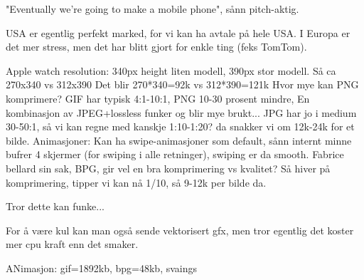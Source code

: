 "Eventually we're going to make a mobile phone", sånn pitch-aktig.

USA er egentlig perfekt marked, for vi kan ha avtale på hele USA. I Europa er
det mer stress, men det har blitt gjort for enkle ting (feks TomTom).

Apple watch resolution: 340px height liten modell, 390px stor modell.
Så ca 270x340 vs 312x390
Det blir 270*340=92k vs 312*390=121k
Hvor mye kan PNG komprimere? GIF har typisk 4:1-10:1, PNG 10-30 prosent mindre,
En kombinasjon av JPEG+lossless funker og blir mye brukt... JPG har jo i medium
30-50:1, så vi kan regne med kanskje 1:10-1:20? da snakker vi om 12k-24k for et
bilde. Animasjoner: Kan ha swipe-animasjoner som default, sånn internt minne
bufrer 4 skjermer (for swiping i alle retninger), swiping er da smooth.
Fabrice bellard sin sak, BPG, gir vel en bra komprimering vs kvalitet?
Så hiver på komprimering, tipper vi kan nå 1/10, så 9-12k per bilde da.

Tror dette kan funke...

For å være kul kan man også sende vektorisert gfx, men tror egentlig det
koster mer cpu kraft enn det smaker.

ANimasjon: gif=1892kb, bpg=48kb, svaings
